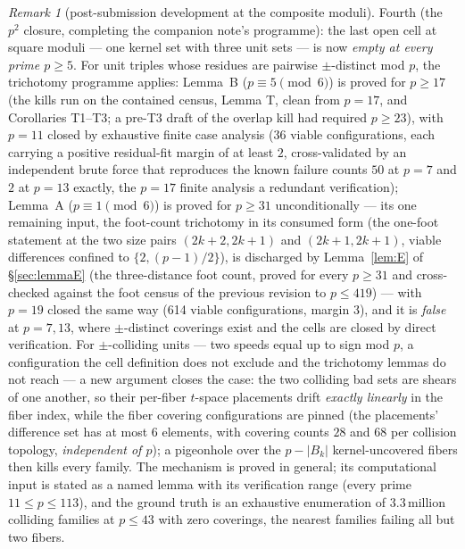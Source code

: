 \documentclass[11pt,a4paper]{article}
\numberwithin{equation}{section}
\theoremstyle{plain}
\theoremstyle{plain}
\theoremstyle{definition}
\theoremstyle{remark}
\newtheorem{remark}[theorem]{Remark}
\begin{document}
\begin{remark}[post-submission development at the composite moduli]
\medskip
Fourth (the $p^2$ closure, completing the companion note's programme):
the last open cell at square moduli --- one kernel set with three unit
sets --- is now \emph{empty at every prime $p\ge5$}.  For unit triples
whose residues are pairwise $\pm$-distinct mod $p$, the trichotomy
programme applies: Lemma~B ($p\equiv5\pmod6$) is proved for $p\ge17$
(the kills run on the contained census, Lemma T, clean from $p=17$, and
Corollaries T1--T3; a pre-T3 draft of the overlap kill had required
$p\ge23$), with $p=11$ closed by exhaustive finite case analysis (36
viable configurations, each carrying a positive residual-fit margin of at
least $2$, cross-validated by an independent brute force that reproduces
the known failure counts $50$ at $p=7$ and $2$ at $p=13$ exactly, the
$p=17$ finite analysis a redundant
verification); Lemma~A ($p\equiv1\pmod6$) is proved for $p\ge31$
unconditionally --- its one remaining input, the foot-count trichotomy
in its consumed form (the one-foot statement at the two size pairs
$(2k{+}2,2k{+}1)$ and $(2k{+}1,2k{+}1)$, viable differences confined to
$\{2,(p-1)/2\}$), is discharged by Lemma~\ref{lem:E} of
\S\ref{sec:lemmaE} (the three-distance foot count, proved for every
$p\ge31$ and cross-checked against the foot census of the previous
revision to $p\le419$) --- with $p=19$ closed the same way (614
viable configurations, margin $3$), and it is \emph{false} at $p=7,13$,
where $\pm$-distinct coverings exist and the cells are closed by direct
verification. For $\pm$-colliding units ---
two speeds equal up to sign mod $p$, a configuration the cell definition
does not exclude and the trichotomy lemmas do not reach --- a new argument
closes the case: the two colliding bad sets are shears of one another, so
their per-fiber $t$-space placements drift \emph{exactly linearly} in the
fiber index, while the fiber covering configurations are pinned (the
placements' difference set has at most $6$ elements, with covering counts
$28$ and $68$ per collision topology, \emph{independent of $p$}); a
pigeonhole over the $p-|B_k|$ kernel-uncovered fibers then kills every
family.  The mechanism is proved in general; its computational input is
stated as a named lemma with its verification range (every prime
$11\le p\le 113$), and the ground truth is an exhaustive enumeration of
$3.3$\,million colliding families at $p\le43$ with zero coverings, the
nearest families failing all but two fibers.


\end{remark}
\end{document}
